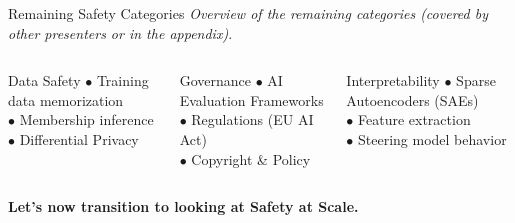 \begin{frame}{Remaining Safety Categories}
  {\footnotesize\itshape Overview of the remaining categories (covered by other presenters or in the appendix).}
  \vspace{0.3em}

  \begin{columns}[T]
    \begin{ucrcard}[UCRnavy]{Data Safety}
      \scriptsize
      $\bullet$ Training data memorization\\
      $\bullet$ Membership inference\\
      $\bullet$ Differential Privacy
    \end{ucrcard}

    \begin{ucrcard}[UCRnavy]{Governance}
      \scriptsize
      $\bullet$ AI Evaluation Frameworks\\
      $\bullet$ Regulations (EU AI Act)\\
      $\bullet$ Copyright \& Policy
    \end{ucrcard}

    \begin{ucrcard}[UCRnavy]{Interpretability}
      \scriptsize
      $\bullet$ Sparse Autoencoders (SAEs)\\
      $\bullet$ Feature extraction\\
      $\bullet$ Steering model behavior
    \end{ucrcard}
  \end{columns}
  
  \vspace{1em}
  \begin{ucrinfo}
    \centering\scriptsize\bfseries
    Let's now transition to looking at Safety at Scale.
  \end{ucrinfo}
\end{frame}


